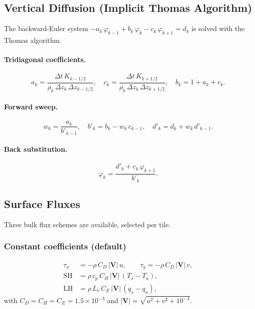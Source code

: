 \documentclass[11pt,a4paper]{article}
\newcommand{\cpd}{c_p}
\newcommand{\Lv}{L_v}
\begin{document}
\subsection{Vertical Diffusion (Implicit Thomas Algorithm)}

The backward-Euler system $-a_k\,\varphi_{k-1}+b_k\,\varphi_k-c_k\,\varphi_{k+1}=d_k$ is solved with the Thomas algorithm.

\paragraph{Tridiagonal coefficients.}
\begin{equation}
  a_k = \frac{\Delta t\,K_{k-1/2}}{\rho_k\,\Delta z_k\,\Delta z_{k-1/2}}, \quad
  c_k = \frac{\Delta t\,K_{k+1/2}}{\rho_k\,\Delta z_k\,\Delta z_{k+1/2}}, \quad
  b_k = 1+a_k+c_k.
\end{equation}

\paragraph{Forward sweep.}
\begin{equation}
  w_k = \frac{a_k}{b'_{k-1}}, \quad b'_k = b_k-w_k\,c_{k-1}, \quad d'_k = d_k+w_k\,d'_{k-1}.
\end{equation}

\paragraph{Back substitution.}
\begin{equation}
  \varphi_k = \frac{d'_k+c_k\,\varphi_{k+1}}{b'_k}.
\end{equation}

\subsection{Surface Fluxes}

Three bulk flux schemes are available, selected per tile.

\subsubsection{Constant coefficients (default)}
\begin{align}
  \tau_x &= -\rho\,C_D\,|\bm V|\,u, \qquad \tau_y = -\rho\,C_D\,|\bm V|\,v, \\
  \mathrm{SH} &= \rho\,\cpd\,C_H\,|\bm V|\,(T_s-T_a), \\
  \mathrm{LH} &= \rho\,\Lv\,C_E\,|\bm V|\,(q_s-q_a),
\end{align}
with $C_D=C_H=C_E=1.5\times10^{-3}$ and $|\bm V|=\sqrt{u^2+v^2+10^{-4}}$.
\end{document}
